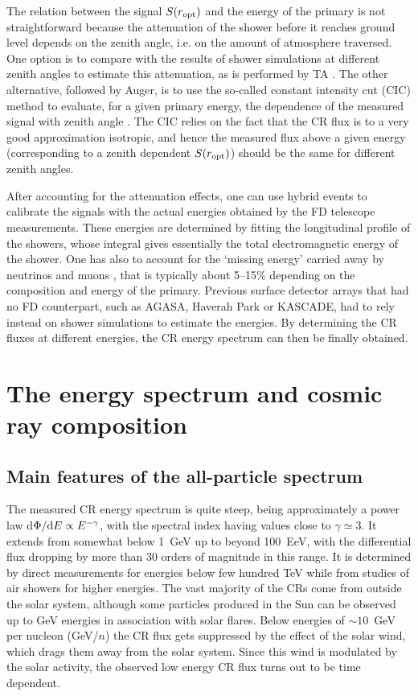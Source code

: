 \documentclass[twoside,12pt]{article}
\begin{document}
The relation between the signal $S(r_{\rm opt})$ and the energy of the primary is not straightforward because the attenuation of the shower before it reaches ground level depends on the zenith angle, i.e. on the amount of atmosphere traversed. One option is to compare with the results of shower simulations at different zenith angles to estimate this attenuation, as is performed by TA \cite{taspect}. The other alternative, followed by Auger, is to use the so-called constant intensity cut (CIC) method to evaluate, for a given primary energy, the dependence of the measured signal with zenith angle \cite{augernim}. The CIC relies on the fact that the CR flux is to a very good approximation isotropic, and hence the measured flux above a given energy (corresponding to a zenith dependent $S(r_{\rm opt})$) should be the same for different  zenith angles. 

After accounting for the attenuation effects, one can use hybrid events to calibrate the signals with the actual energies obtained by the FD telescope measurements. These energies are determined by fitting the longitudinal profile of the showers, whose integral gives essentially the total electromagnetic energy of the shower. One has also to account for the `missing energy' carried away by neutrinos and muons \cite{ba04}, that is typically about 5--15\% depending on the composition and energy of the primary. Previous surface detector arrays that had no FD counterpart, such as AGASA, Haverah Park or KASCADE, had to rely instead on shower simulations to estimate the energies. 
By determining the CR fluxes at different energies, the CR energy spectrum can then be finally obtained.


\section{The energy spectrum and cosmic ray composition}
\subsection{Main features of the all-particle spectrum}
The measured CR energy spectrum is quite steep, being approximately a power law d$\Phi/{\rm d}E\propto E^{-\gamma}$, with the spectral index having values close to $\gamma\simeq 3$. It  extends from somewhat below 1~GeV up to beyond 100~EeV, with the
differential  flux dropping by more than 30 orders of magnitude in this range. It is determined by direct measurements for energies below few hundred TeV while from studies of air showers  for higher energies. 
 The vast majority of the CRs come from outside the solar system,  although some particles produced in the Sun can be observed up to GeV energies in association with solar flares.
Below energies of $\sim 10$~GeV per nucleon (GeV/$n$)  the CR flux gets suppressed by the effect of the solar wind, which drags them away from the solar system. Since this wind is modulated by the solar activity, the observed low energy CR flux turns out to be time dependent.
\end{document}
